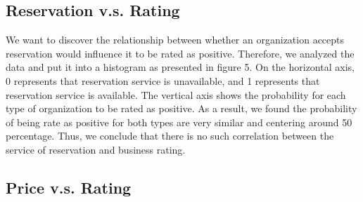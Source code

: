 \documentclass{article}
\begin{document}
\subsection{Reservation v.s. Rating}
We want to discover the relationship between whether an organization accepts reservation would influence it to be rated as positive. Therefore, we analyzed the data and put it into a histogram as presented in figure 5. On the horizontal axis, 0 represents that reservation service is unavailable, and 1 represents that reservation service is available. The vertical axis shows the probability for each type of organization to be rated as positive. As a result, we found the probability of being rate as positive for both types are very similar and centering around 50 percentage. Thus, we conclude that there is no such correlation between the service of reservation and business rating. 

\subsection{Price v.s. Rating}
\end{document}
